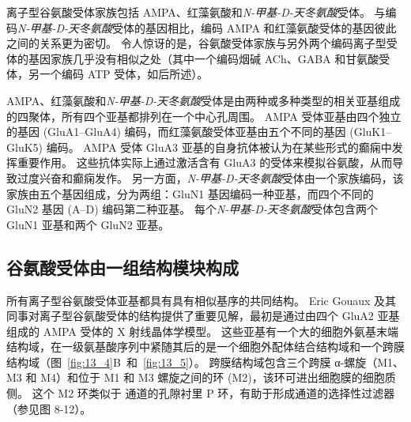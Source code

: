 离子型谷氨酸受体家族包括 AMPA、红藻氨酸和\textit{N-甲基-D-天冬氨酸}受体。
与编码\textit{N-甲基-D-天冬氨酸}受体的基因相比，编码 AMPA 和红藻氨酸受体的基因彼此之间的关系更为密切。
令人惊讶的是，谷氨酸受体家族与另外两个编码离子型受体的基因家族几乎没有相似之处（其中一个编码烟碱 ACh、GABA 和甘氨酸受体，另一个编码 ATP 受体，如后所述）。


AMPA、红藻氨酸和\textit{N-甲基-D-天冬氨酸}受体是由两种或多种类型的相关亚基组成的四聚体，所有四个亚基都排列在一个中心孔周围。
AMPA 受体亚基由四个独立的基因 (GluA1–GluA4) 编码，而红藻氨酸受体亚基由五个不同的基因 (GluK1–GluK5) 编码。
AMPA 受体 GluA3 亚基的自身抗体被认为在某些形式的癫痫中发挥重要作用。
这些抗体实际上通过激活含有 GluA3 的受体来模拟谷氨酸，从而导致过度兴奋和癫痫发作。
另一方面，\textit{N-甲基-D-天冬氨酸}受体由一个家族编码，该家族由五个基因组成，分为两组：GluN1 基因编码一种亚基，而四个不同的 GluN2 基因 (A–D) 编码第二种亚基。
每个\textit{N-甲基-D-天冬氨酸}受体包含两个 GluN1 亚基和两个 GluN2 亚基。



\subsection{谷氨酸受体由一组结构模块构成}

所有离子型谷氨酸受体亚基都具有具有相似基序的共同结构。
Eric Gouaux 及其同事对离子型谷氨酸受体的结构提供了重要见解，最初是通过由四个 GluA2 亚基组成的 AMPA 受体的 X 射线晶体学模型。
这些亚基有一个大的细胞外氨基末端结构域，在一级氨基酸序列中紧随其后的是一个细胞外配体结合结构域和一个跨膜结构域（图~\ref{fig:13_4}B~和~\ref{fig:13_5}）。
跨膜结构域包含三个跨膜 α-螺旋（M1、M3 和 M4）和位于 M1 和 M3 螺旋之间的环 (M2)，该环可进出细胞膜的细胞质侧。
这个 M2 环类似于  通道的孔隙衬里 P 环，有助于形成通道的选择性过滤器（参见图 8-12）。


